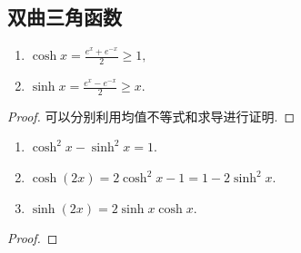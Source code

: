 \documentclass[../../main.tex]{subfiles}
\begin{document}
\subsection{双曲三角函数}

\begin{proposition}
\begin{enumerate}[(1)]
\item $\cosh x=\frac{e^{x}+e^{-x}}{2}\geqslant1,$

\item $\sinh x=\frac{e^{x}-e^{-x}}{2}\geqslant x.$
\end{enumerate}
\end{proposition}
\begin{proof}
可以分别利用均值不等式和求导进行证明. 
\end{proof}

\begin{proposition}
\begin{enumerate}
\item $\cosh^2 x-\sinh^2 x=1$.

\item $\cosh(2x)=2\cosh^2 x-1=1-2\sinh^2 x$.

\item $\sinh(2x)=2\sinh x\cosh x$. 
\end{enumerate}
\end{proposition}
\begin{proof}

\end{proof}
\end{document}
